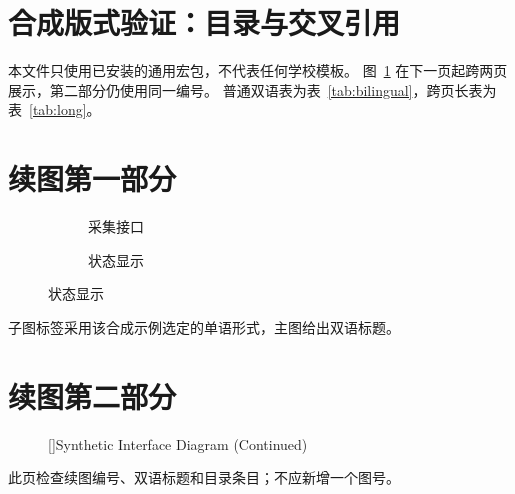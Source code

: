 \documentclass[UTF8]{ctexart}
\begin{document}
\section*{合成版式验证：目录与交叉引用}
本文件只使用已安装的通用宏包，不代表任何学校模板。
图~\ref{fig:synthetic} 在下一页起跨两页展示，第二部分仍使用同一编号。
普通双语表为表~\ref{tab:bilingual}，跨页长表为表~\ref{tab:long}。
\listoffigures
\listoftables
\clearpage
\section*{续图第一部分}
\begin{figure}[htbp]
  \centering
  \begin{subfigure}{0.44\linewidth}
    \centering\fbox{\rule{0pt}{30mm}\rule{48mm}{0pt}}
    \caption{采集接口}
  \end{subfigure}\hfill
  \begin{subfigure}{0.44\linewidth}
    \centering\fbox{\rule{0pt}{30mm}\rule{48mm}{0pt}}
    \caption{状态显示}
  \end{subfigure}
  \label{fig:synthetic}
\end{figure}
子图标签采用该合成示例选定的单语形式，主图给出双语标题。
\clearpage
\section*{续图第二部分}
\begin{figure}[htbp]
  \ContinuedFloat
  \centering
  \fbox{\rule{0pt}{35mm}\rule{105mm}{0pt}}
  []{Synthetic Interface Diagram (Continued)}
\end{figure}
此页检查续图编号、双语标题和目录条目；不应新增一个图号。
\clearpage
\end{document}
